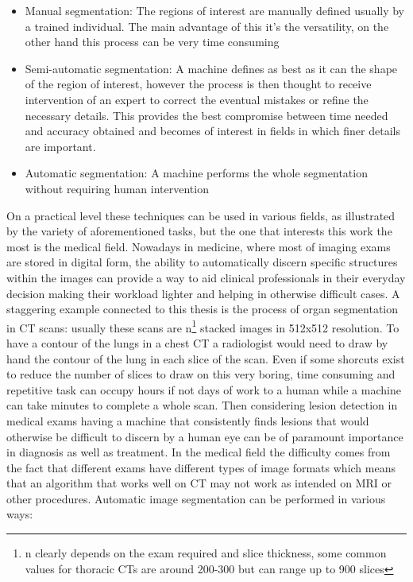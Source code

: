 \begin{itemize}
\item Manual segmentation: The regions of interest are manually defined usually by a trained individual. The main advantage of this it's the versatility, on the other hand this process can be very time consuming
\item Semi-automatic segmentation: A machine defines as best as it can the shape of the region of interest, however the process is then thought to receive intervention of an expert to correct the eventual mistakes or refine the necessary details. This provides the best compromise between time needed and accuracy obtained and becomes of interest in fields in which finer details are important.
\item Automatic segmentation: A machine performs the whole segmentation without requiring human intervention
\end{itemize}

On a practical level these techniques can be used in various fields, as illustrated by the variety of aforementioned tasks, but the one that interests this work the most is the medical field.
Nowadays in medicine, where most of imaging exams are stored in digital form, the ability to automatically discern specific structures within the images can provide a way to aid clinical professionals in their everyday decision making their workload lighter and helping in otherwise difficult cases.
A staggering example connected to this thesis is the process of organ segmentation in CT scans: usually these scans are n\footnote{n clearly depends on the exam required and slice thickness, some common values for thoracic CTs are around 200-300 but can range up to 900 slices} stacked images in 512x512 resolution. To have a contour of the lungs in a chest CT a radiologist would need to draw by hand the contour of the lung in each slice of the scan. Even if some shorcuts exist to reduce the number of slices to draw on this very boring, time consuming and repetitive task can occupy hours if not days of work to a human  while a machine can take minutes to complete a whole scan. Then considering lesion detection in medical exams having a machine that consistently finds lesions that would otherwise be difficult to discern by a human eye can be of paramount importance in diagnosis as well as treatment.
In the medical field the difficulty comes from the fact that different exams have different types of image formats which means that an algorithm that works well on CT may not work as intended on MRI or other procedures. 
Automatic image segmentation can be performed in various ways:

